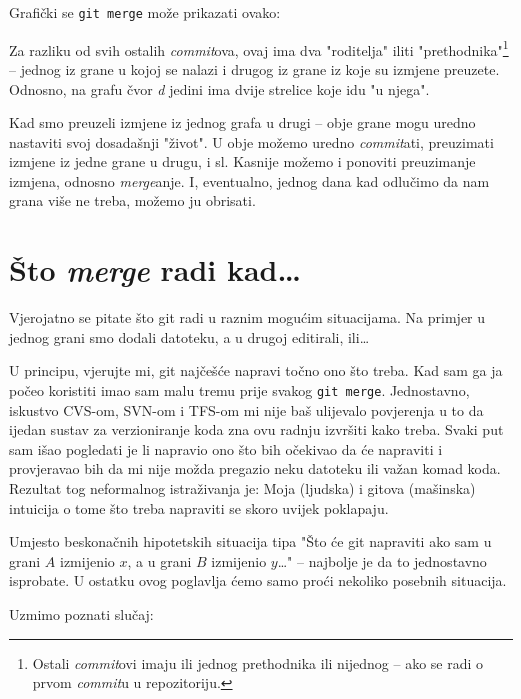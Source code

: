 Grafički se \verb+git merge+ može prikazati ovako:



Za razliku od svih ostalih \emph{commit}ova, ovaj ima dva "roditelja" iliti "prethodnika"\footnote{Ostali \emph{commit}ovi imaju ili jednog prethodnika ili nijednog -- ako se radi o prvom \emph{commit}u u repozitoriju.} -- jednog iz grane u kojoj se nalazi i drugog iz grane iz koje su izmjene preuzete.
Odnosno, na grafu čvor \emph d jedini ima dvije strelice koje idu "u njega".

Kad smo preuzeli izmjene iz jednog grafa u drugi -- obje grane mogu uredno nastaviti svoj dosadašnji "život".
U obje možemo uredno \emph{commit}ati, preuzimati izmjene iz jedne grane u drugu, i sl.
Kasnije možemo i ponoviti preuzimanje izmjena, odnosno \emph{merge}anje.
I, eventualno, jednog dana kad odlučimo da nam grana više ne treba, možemo ju obrisati.





\section*{Što \emph{merge} radi kad\dots}

Vjerojatno se pitate što git radi u raznim mogućim situacijama. Na primjer u jednog grani smo dodali datoteku, a u drugoj editirali, ili\dots

U principu, vjerujte mi, git najčešće napravi točno ono što treba. 
Kad sam ga ja počeo koristiti imao sam malu tremu prije svakog \verb+git merge+.
Jednostavno, iskustvo CVS-om, SVN-om i TFS-om mi nije baš ulijevalo povjerenja u to da ijedan sustav za verzioniranje koda zna ovu radnju izvršiti kako treba.
Svaki put sam išao pogledati je li napravio ono što bih očekivao da će napraviti i provjeravao bih da mi nije možda pregazio neku datoteku ili važan komad koda.
Rezultat tog neformalnog istraživanja je: Moja (ljudska) i gitova (mašinska) intuicija o tome što treba napraviti se skoro uvijek poklapaju.

Umjesto beskonačnih hipotetskih situacija tipa "Što će git napraviti ako sam u grani $A$ izmijenio $x$, a u grani $B$ izmijenio $y$\dots" -- najbolje je da to jednostavno isprobate. 
U ostatku ovog poglavlja ćemo samo proći nekoliko posebnih situacija.

Uzmimo poznati slučaj:

